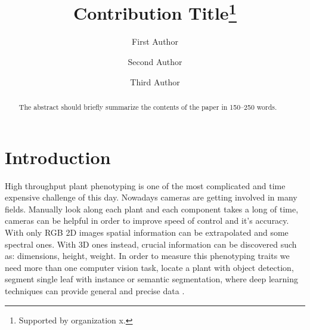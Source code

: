 \documentclass[runningheads]{llncs}
\begin{document}
%
\title{Contribution Title\thanks{Supported by organization x.}}
%
%
\author{First Author \and
Second Author \and
Third Author}
%
%
%
\maketitle              %
%
\begin{abstract}
The abstract should briefly summarize the contents of the paper in
150--250 words.

\end{abstract}
%
%
%
\clearpage

\section{Introduction}
High throughput plant phenotyping is one of the most complicated and time expensive challenge of this day. Nowadays cameras are getting
involved in many fields. Manually look along each plant and each component takes a long of time, cameras can be helpful in order to improve
speed of control and it's accuracy. With only RGB 2D images spatial information can be extrapolated and some spectral ones. With 3D ones instead,
crucial information can be discovered such as: dimensions, height, weight. In order to measure this phenotyping traits we need more than one computer
vision task, locate a plant with object detection, segment single leaf with instance or semantic segmentation, where deep learning techniques can provide
general and precise data \cite{CNN_HTPP_R}.
\end{document}
